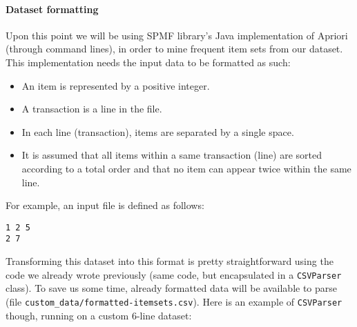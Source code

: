 \documentclass[11pt]{article}
\providecommand{\tightlist}{%
      \setlength{\itemsep}{0pt}\setlength{\parskip}{0pt}}
\begin{document}
\hypertarget{dataset-formatting}{%
\paragraph{Dataset formatting}\label{dataset-formatting}}

Upon this point we will be using SPMF library's Java implementation of
Apriori (through command lines), in order to mine frequent item sets
from our dataset. This implementation needs the input data to be
formatted as such:

\begin{itemize}
\tightlist
\item
  An item is represented by a positive integer.
\item
  A transaction is a line in the file.
\item
  In each line (transaction), items are separated by a single space.
\item
  It is assumed that all items within a same transaction (line) are
  sorted according to a total order and that no item can appear twice
  within the same line.
\end{itemize}

For example, an input file is defined as follows:

\begin{verbatim}
1 2 5
2 7
\end{verbatim}

Transforming this dataset into this format is pretty straightforward
using the code we already wrote previously (same code, but encapsulated
in a \texttt{CSVParser} class). To save us some time, already formatted
data will be available to parse (file
\texttt{custom\_data/formatted-itemsets.csv}). Here is an example of
\texttt{CSVParser} though, running on a custom 6-line dataset:
\end{document}
